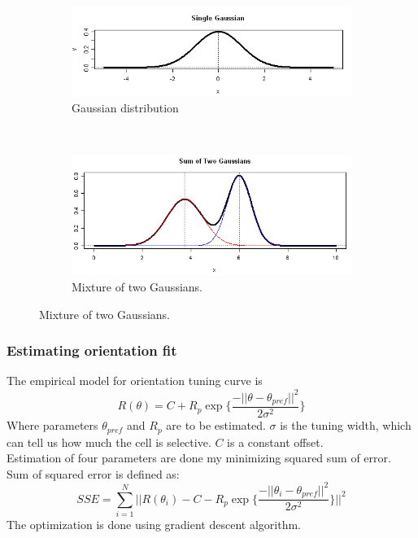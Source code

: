 \documentclass[11pt]{article}
\newcommand{\rulesep}{\unskip\ \vrule\ }
\begin{document}
\begin{figure}
\centering
\caption{Modeling orientation and directional selectivity using Gaussians}
\label{gauss}
\begin{subfigure}{.48\textwidth}
    \centering
    \includegraphics[width=\linewidth]{plots/gauss.png}
    \caption{Gaussian distribution}
\end{subfigure}
\rulesep
\begin{subfigure}{.48\textwidth}
    \centering
    \includegraphics[width=\linewidth]{plots/double_gauss.png}
    \caption{Mixture of two Gaussians.}
\end{subfigure}
\end{figure}

\subsubsection{Estimating orientation fit} %
\label{ssub:estimating_orientation_fit}
The empirical model for orientation tuning curve is
$$R(\theta) = C + R_p \exp\{\frac{-||\theta-\theta_{pref}||^2}{2\sigma^2}\}$$
Where parameters $\theta_{pref}$ and $R_p$ are to be estimated. $\sigma$ is the tuning width, which can tell us how much the cell is selective. $C$ is a constant offset.\\
Estimation of four parameters are done my minimizing squared sum of error. Sum of squared error is defined as:
$$SSE = \sum_{i=1}^N ||R(\theta_i) - C - R_p \exp\{\frac{-||\theta_i-\theta_{pref}||^2}{2\sigma^2}\}||^2$$
The optimization is done using gradient descent algorithm.\\
\end{document}
